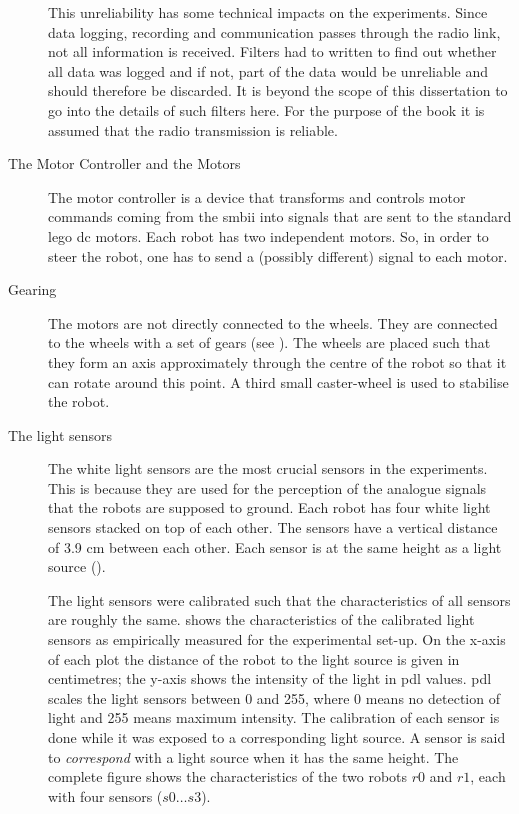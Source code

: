 \begin{description}
This unreliability has some technical impacts on the experiments. Since data logging, recording and communication passes through the radio link, not all information is received. Filters had to written to find out whether all data was logged and if not, part of the data would be unreliable and should therefore be discarded. It is beyond the scope of this dissertation to go into the details of such filters here. For the purpose  of the book it is assumed that the radio transmission is reliable.

\item[The Motor Controller and the Motors] The motor controller is a device that transforms and controls motor commands coming from the {\sc smbii} into signals that are sent to the standard {\sc lego dc} motors. Each robot has two independent motors. So, in order to steer the robot, one has to send a (possibly different) signal to each motor.

\item[Gearing] The motors are not directly connected to the wheels. They are connected to the wheels with a set of gears (see ). The wheels are placed such that they form an axis approximately through the centre of the robot so that it can rotate around this point. A third small caster-wheel is used to stabilise the robot. 

\item[The light sensors] The white light sensors are the most crucial sensors in the experiments. This is because they are used for the perception of the analogue signals that the robots are supposed to ground. Each robot has four white light sensors stacked on top of each other. The sensors have a vertical distance of 3.9 cm between each other. Each sensor is at the same height as a light source (). 

The light sensors were calibrated such that the characteristics of all sensors are roughly the same.  shows the characteristics of the calibrated light sensors as empirically measured for the experimental set-up. On the x-axis of each plot the distance of the robot to the light source is given in centimetres; the y-axis shows the intensity of the light in {\sc pdl} values. {\sc pdl} scales the light sensors between 0 and 255, where 0 means no detection of light and 255 means maximum intensity. The calibration of each sensor is done while it was exposed to a corresponding light source. A sensor is said to {\em correspond} with a light source when it has the same height. The complete figure shows the characteristics of the two robots $r0$ and $r1$, each with four sensors ($s0 \ldots s3$).


\end{description}
